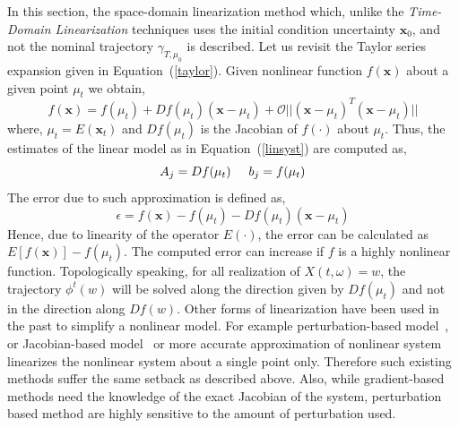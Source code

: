In this section, the space-domain linearization method which, unlike the \textit{Time-Domain Linearization} techniques uses the initial condition uncertainty $\textbf{x}_0$, and not the nominal trajectory $\gamma_{T,\mu_0}$ is described.
Let us revisit the Taylor series expansion given in Equation~(\ref{taylor}). Given nonlinear function $f(\textbf{x})$ about a given point $\mu_t$ we obtain,
\begin{equation}
\label{jacobian}
f(\textbf{x}) = f(\mu_t) + Df(\mu_t) (\textbf{x} - \mu_t) + \mathcal{O} ||(\mathbf{x}  - \mu_t)^T(\mathbf{x}  - \mu_t)||
\end{equation}   
where, $\mu_t = E(\textbf{x}_t)$ and $Df(\mu_t)$ is the Jacobian of $f(\cdot)$ about $\mu_t$. Thus, the estimates of the linear model as in Equation~(\ref{linsyst}) are  computed as,
\begin{equation}
A_j = Df(\mu_t) \hspace{5 mm} b_j = f(\mu_t)
\end{equation}
The error due to such approximation is defined as,
\begin{equation}
\epsilon = f(\textbf{x}) - f(\mu_t) - Df(\mu_t) (\textbf{x} - \mu_t)
\end{equation} 
Hence, due to linearity of the operator $E(\cdot)$, the error can be calculated as $E \left[f(\textbf{x})\right] - f(\mu_t)$. The computed error can increase if $f$ is a highly nonlinear function. Topologically speaking, for all realization of $X(t,\omega) = w$, the trajectory $\phi^t(w)$ will be solved along the direction given by $Df(\mu_t)$ and not in the direction along $Df(w)$.
Other forms of linearization have been used in the past to simplify a nonlinear model. For example perturbation-based model~\cite{de2012efficient}, or Jacobian-based model~\cite{carbonell2007numerical,he2011enhanced,guardone2002roe} or more accurate approximation of nonlinear system~\cite{steeb1980non} linearizes the nonlinear system about a single point only. Therefore such existing methods suffer the same setback as described above. Also, while gradient-based methods need the knowledge of the exact Jacobian of the system, perturbation based method are highly sensitive to the amount of perturbation used. 

